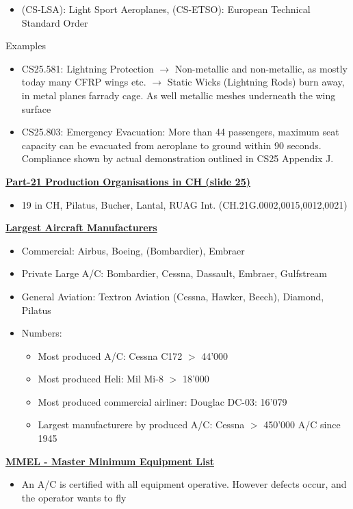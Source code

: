 \documentclass[9pt, landscape, fleqn]{scrartcl}
\begin{document}
\begin{multicols*}{3}
\begin{itemize}
\begin{itemize}
        \item (CS-LSA): Light Sport Aeroplanes, (CS-ETSO): European Technical Standard Order 
    \end{itemize}
\end{itemize}
Examples
\begin{itemize}
    \item CS25.581: Lightning Protection $\rightarrow$ Non-metallic and non-metallic, as mostly today many CFRP wings etc. $\rightarrow$ Static Wicks (Lightning Rods) burn away, in metal planes farrady cage. As well metallic meshes underneath the wing surface
    \item CS25.803: Emergency Evacuation: More than 44 passengers, maximum seat capacity can be evacuated from aeroplane to ground within 90 seconds. Compliance shown by actual demonstration outlined in CS25 Appendix J. 
\end{itemize}
\underline{\textbf{Part-21 Production Organisations in CH (slide 25)}}
\begin{itemize}
    \item 19 in CH, Pilatus, Bucher, Lantal, RUAG Int. (CH.21G.0002,0015,0012,0021)
\end{itemize}
\underline{\textbf{Largest Aircraft Manufacturers}}
\begin{itemize}
    \item Commercial: Airbus, Boeing, (Bombardier), Embraer
    \item Private Large A/C: Bombardier, Cessna, Dassault, Embraer, Gulfstream
    \item General Aviation: Textron Aviation (Cessna, Hawker, Beech), Diamond, Pilatus
    \item Numbers:
    \begin{itemize}
        \item Most produced A/C: Cessna C172 $>$ 44'000
        \item Most produced Heli: Mil Mi-8 $>$ 18'000
        \item Most produced commercial airliner: Douglac DC-03: 16'079 
        \item Largest manufacturere by produced A/C: Cessna $>$ 450'000 A/C since 1945
    \end{itemize}
\end{itemize}
\underline{\textbf{MMEL - Master Minimum Equipment List}}
\begin{itemize}
    \item An A/C is certified with all equipment operative. However defects occur, and the operator wants to fly 

\end{itemize}
\end{multicols*}
\end{document}

